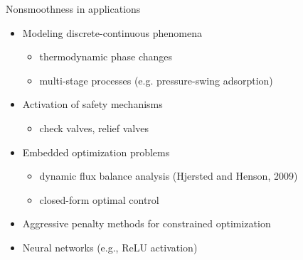 \documentclass[10pt]{beamer}
\begin{document}
\begin{frame}{Nonsmoothness in applications}
\begin{itemize}\setlength{\itemsep}{10pt}
  \item Modeling discrete-continuous phenomena
  \begin{itemize}
      \item thermodynamic phase changes
      \item multi-stage processes (e.g. pressure-swing adsorption)
  \end{itemize}
  \item Activation of safety mechanisms
    \begin{itemize}
    \item check valves, relief valves
    \end{itemize}
  \item Embedded optimization problems
    \begin{itemize}
    \item dynamic flux balance analysis (Hjersted and Henson, 2009)
    \item closed-form optimal control
    \end{itemize}
  \item Aggressive penalty methods for constrained optimization
  \item Neural networks (e.g., ReLU activation)
  \end{itemize}
\end{frame}
\end{document}
